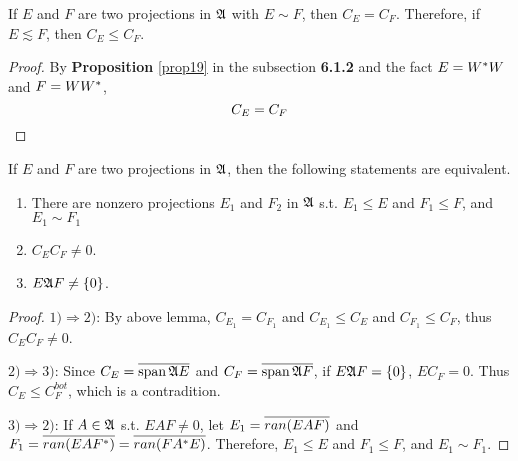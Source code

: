 \begin{lem}
	If $E$ and $F$ are two projections in $\mathfrak{A}$  with $E \sim F$, then $C_E = C_F$. Therefore, if $E \lesssim F$, then $C_E \leqslant C_F$.
\end{lem}
\begin{proof}
	By \textbf{Proposition} \ref{prop19} in the subsection \textbf{6.1.2} and the fact $E = W^{*}W$ and $F = WW^{*}$,
	\begin{equation*}
		C_E  = C_F \qedhere
	\end{equation*}
\end{proof}

\begin{prop}
	If $E$ and $F$ are two projections in $\mathfrak{A}$, then the following statements are equivalent.
	\begin{enumerate}[label=\arabic*)]
		\item There are nonzero projections $E_1$ and $F_2$ in $\mathfrak{A}$ s.t. $E_1 \leqslant E$ and $F_1 \leqslant F$, and $E_1 \sim F_1$
		\item $C_E C_F  \neq 0$.
		\item $E\mathfrak{A} F \neq \{0\}$.
	\end{enumerate}
\end{prop}
\begin{proof}
	$1) \Rightarrow 2)$: By above lemma, $C_{E_1} =  C_{F_1}$ and $C_{E_1} \leqslant C_{E}$ and $C_{F_1} \leqslant C_{F}$, thus $C_E C_F  \neq 0$.
	\item $2) \Rightarrow 3)$: Since $C_E = \overline{\operatorname{span}{\mathfrak{A} E}}$ and $C_F = \overline{\operatorname{span}{\mathfrak{A} F}}$, if $E\mathfrak{A} F = \{0\}$, $EC_F = 0$. Thus $C_E  \leqslant C_F^{bot}$, which is a contradition.
	\item $3) \Rightarrow 2)$: If $A \in \mathfrak{A}$ s.t. $EAF \neq 0$, let $E_1 = \overline{ran(EAF)}$ and $F_1 = \overline{ran(EAF^{*})} = \overline{ran(FA^{*}E)}$. Therefore, $E_1 \leqslant E$ and $F_1 \leqslant F$, and $E_1 \sim F_1$.
\end{proof}

